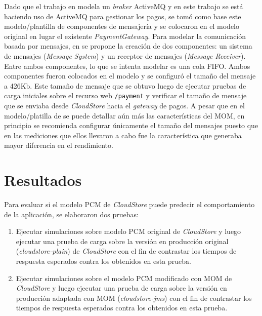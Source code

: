 \documentclass[article]{IEEEtran}
\begin{document}
Dado que el trabajo en \cite{happe-et-al} modela un \emph{broker} ActiveMQ y en este trabajo se está haciendo uso de ActiveMQ para gestionar los pagos, se tomó como base este modelo/plantilla de componentes de mensajería y se colocaron en el modelo original en lugar el existente \emph{PaymentGateway}. Para modelar la comunicación basada por mensajes, en \cite{happe-et-al} se propone la creación de dos componentes: un sistema de mensajes (\emph{Message System}) y un receptor de mensajes (\emph{Message Receiver}). Entre ambos componentes, lo que se intenta modelar es una cola FIFO. Ambos componentes fueron colocados en el modelo y se configuró el tamaño del mensaje a 426Kb. Este tamaño de mensaje que se obtuvo luego de ejecutar pruebas de carga iniciales sobre el recurso web \texttt{/payment} y verificar el tamaño de mensaje que se enviaba desde \emph{CloudStore} hacia el \emph{gateway} de pagos. A pesar que en el modelo/platilla de \cite{happe-et-al} se puede detallar aún más las características del MOM, en principio se recomienda configurar únicamente el tamaño del mensajes puesto que en las mediciones que ellos llevaron a cabo fue la característica que generaba mayor diferencia en el rendimiento.

\section{Resultados} \label{sec:resultados}
Para evaluar si el modelo PCM de \emph{CloudStore} puede predecir el comportamiento de la aplicación, se elaboraron dos pruebas: 
\begin{enumerate}
    \item Ejecutar simulaciones sobre modelo PCM original de \emph{CloudStore} y luego ejecutar una prueba de carga sobre la versión en producción original (\emph{cloudstore-plain}) de \emph{CloudStore} con el fin de contrastar los tiempos de respuesta esperados contra los obtenidos en esta prueba.
    \item Ejecutar simulaciones sobre el modelo PCM modificado con MOM de \emph{CloudStore} y luego ejecutar una prueba de carga sobre la versión en producción adaptada con MOM (\emph{cloudstore-jms}) con el fin de contrastar los tiempos de respuesta esperados contra los obtenidos en esta prueba.
\end{enumerate}
\end{document}
